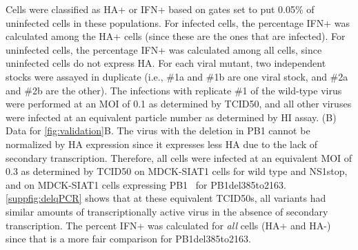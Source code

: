 \documentclass[lineno]{asm-article}
\newcommand{\FIG}[1]{\autoref{fig:#1}}
\newcommand{\SUPPFIG}[1]{\autoref{suppfig:#1}}
\begin{document}
\begin{suppfig}
{Cells were classified as HA+ or IFN+ based on gates set to put 0.05\% of uninfected cells in these populations.
For infected cells, the percentage IFN+ was calculated among the HA+ cells (since these are the ones that are infected).
For uninfected cells, the percentage IFN+ was calculated among all cells, since uninfected cells do not express HA.
For each viral mutant, two independent stocks were assayed in duplicate (i.e., \#1a and \#1b are one viral stock, and \#2a and \#2b are the other).
The infections with replicate \#1 of the wild-type virus were performed at an MOI of 0.1 as determined by TCID50, and all other viruses were infected at an equivalent particle number as determined by HI assay. 
(B)
Data for \FIG{validation}B.
The virus with the deletion in PB1 cannot be normalized by HA expression since it expresses less HA due to the lack of secondary transcription.
Therefore, all cells were infected at an equivalent MOI of 0.3 as determined by TCID50 on MDCK-SIAT1 cells for wild type and NS1stop, and on MDCK-SIAT1 cells expressing PB1~\cite{bloom2010permissive} for PB1del385to2163.
\SUPPFIG{delqPCR} shows that at these equivalent TCID50s, all variants had similar amounts of transcriptionally active virus in the absence of secondary transcription.
The percent IFN+ was calculated for \emph{all} cells (HA+ and HA-) since that is a more fair comparison for PB1del385to2163.
}
\label{suppfig:validationflow}
\end{suppfig}
\end{document}
